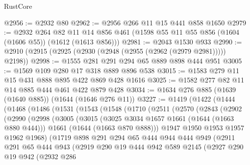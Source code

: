 \begin{lexlean}{RustCore}
\begin{coremodule}
@2956 := @2932 @80
@2962 := @2956 @266 @11 @15 @441 @858 @1650
@2979 := @2932
    @264
    @82
    @11
    @14
    @856
    @461
    (@1598 @55 @11 @55 @856 (@1604 (@1606 @55)) (@1612 (@1613 @856)))
@2981 := @2043 @1530 @933
@2990 := @2910 (@2915 (@2925 (@2930 (@2948 (@2955 (@2962 (@2979 @2981))))) @2198))
@2998 := @1555 @281 @291 @294 @65 @889 @898 @444 @951
@3005 := @1569 @109 @280 @17 @318 @889 @896 @538
@3015 := @1583 @279 @11 @15 @431 @888 @895 @422 @869 @428 @1616
@3025 := @1582 @277 @82 @11 @14 @885 @444 @461 @422 @879 @428
@3034 := @1634 @276 @885 (@1639 (@1640 @885)) (@1644 (@1646 @276 @11))
@3227 := @1419
    (@1422
      (@1444
        (@1468
          (@1486
            (@1531
              (@1543
                (@1548
                  (@1710
                    (@2511
                      (@2570
                        (@2843
                          (@2902
                            (@2990
                              (@2998
                                (@3005
                                  (@3015
                                    (@3025 @3034 @1657 @1661 (@1644 (@1663 @880 @444)))
                                    @1661
                                    (@1644 (@1663 @870 @888)))
                                  @1947
                                  @1950
                                  @1953
                                  @1957
                                  @1962
                                  @1968)
                                (@1719
                                  @898
                                  @291
                                  @294
                                  @65
                                  @444
                                  @944
                                  @444
                                  @949
                                  (@2911
                                    @291
                                    @65
                                    @444
                                    @943
                                    (@2919
                                      @290
                                      @19
                                      @444
                                      @942
                                      @589
                                      @2145
                                      (@2927
                                        @290
                                        @19
                                        @942
                                        (@2932
                                          @286

\end{coremodule}
\end{lexlean}
